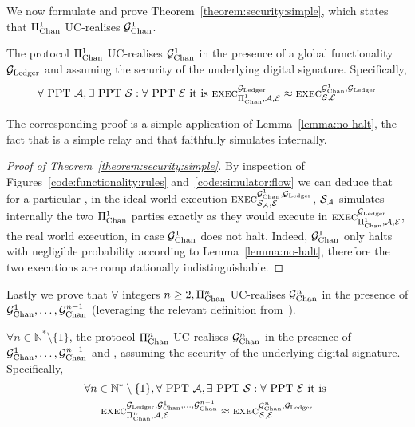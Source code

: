   We now formulate and prove Theorem~\ref{theorem:security:simple}, which states
  that $\Pi_{\mathrm{Chan}}^{1}$ UC-realises $\mathcal{G}_{\mathrm{Chan}}^{1}$.

\begin{theorem}
  \label{theorem:security:simple}
  The protocol $\Pi_{\mathrm{Chan}}^{1}$ UC-realises $\mathcal{G}_{\mathrm{Chan}}^{1}$ in the presence of a
  global functionality $\mathcal{G}_{\mathrm{Ledger}}$ and assuming the security of the underlying
  digital signature. Specifically,
  \begin{gather*}
    \forall \text{ PPT } \mathcal{A}, \exists \text{ PPT } \mathcal{S}: \forall
    \text{ PPT } \mathcal{E} \text{ it is }
    \textsc{exec}^{\mathcal{G}_{\mathrm{Ledger}}}_{\Pi_{\mathrm{Chan}}^{1}, \mathcal{A}, \mathcal{E}} \approx
    \textsc{exec}^{\mathcal{G}_{\mathrm{Chan}}^{1}, \mathcal{G}_{\mathrm{Ledger}}}_{\mathcal{S}, \mathcal{E}}
  \end{gather*}
\end{theorem}

  The corresponding proof is a simple application of
  Lemma~\ref{lemma:no-halt}, the fact that \fchan is a simple relay and that
  \simulator faithfully simulates \pchan internally.

\begin{proof}[Proof of Theorem~\ref{theorem:security:simple}]
  By inspection of Figures~\ref{code:functionality:rules}
  and~\ref{code:simulator:flow} we can deduce that for a particular
  \environment, in the ideal world execution $\textsc{exec}^{\mathcal{G}_{\mathrm{Chan}}^{1},
  \mathcal{G}_{\mathrm{Ledger}}}_{\mathcal{S}_{\mathcal{A}}, \mathcal{E}}$, $\mathcal{S}_{\mathcal{A}}$
  simulates internally the two $\Pi_{\mathrm{Chan}}^{1}$ parties exactly as they would execute in
  $\textsc{exec}^{\mathcal{G}_{\mathrm{Ledger}}}_{\Pi_{\mathrm{Chan}}^{1}, \mathcal{A}, \mathcal{E}}$, the real world
  execution, in case $\mathcal{G}_{\mathrm{Chan}}^{1}$ does not halt. Indeed, $\mathcal{G}_{\mathrm{Chan}}^{1}$ only halts with
  negligible probability according to Lemma~\ref{lemma:no-halt}, therefore the
  two executions are computationally indistinguishable.
\end{proof}

  Lastly we prove that $\forall$ integers $n \geq 2, \Pi_{\mathrm{Chan}}^{n}$ UC-realises
  $\mathcal{G}_{\mathrm{Chan}}^{n}$ in the presence of $\mathcal{G}_{\mathrm{Chan}}^{1}, \dots, \mathcal{G}_{\mathrm{Chan}}^{n-1}$
  (leveraging the relevant definition
  from~\cite{DBLP:conf/tcc/BadertscherCHTZ20}).

\begin{theorem}
  \label{theorem:security:virtual}
  $\forall n \in \mathbb{N}^* \setminus \{1\}$, the protocol $\Pi_{\mathrm{Chan}}^{n}$
  UC-realises $\mathcal{G}_{\mathrm{Chan}}^{n}$ in the presence of $\mathcal{G}_{\mathrm{Chan}}^{1}, \dots,
  \mathcal{G}_{\mathrm{Chan}}^{n-1}$ and \ledger, assuming the security of the underlying digital
  signature. Specifically,
  \begin{gather*}
    \forall n \in \mathbb{N}^* \setminus \{1\}, \forall \text{ PPT } \mathcal{A},
    \exists \text{ PPT } \mathcal{S}: \forall \text{ PPT } \mathcal{E} \text{ it
    is } \\
    \textsc{exec}^{\mathcal{G}_{\mathrm{Ledger}}, \mathcal{G}_{\mathrm{Chan}}^{1}, \dots, \mathcal{G}_{\mathrm{Chan}}^{n-1}}_{\Pi_{\mathrm{Chan}}^{n},
    \mathcal{A}, \mathcal{E}} \approx
    \textsc{exec}^{\mathcal{G}_{\mathrm{Chan}}^{n}, \mathcal{G}_{\mathrm{Ledger}}}_{\mathcal{S}, \mathcal{E}}
  \end{gather*}
\end{theorem}


